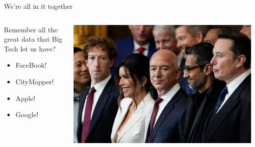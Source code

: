 \documentclass[
  ignorenonframetext,
  aspectratio=149,
]{beamer}
\providecommand{\tightlist}{%
  \setlength{\itemsep}{0pt}\setlength{\parskip}{0pt}}\usepackage{longtable,booktabs,array}
\begin{document}
\begin{frame}{We're all in it together}
\label{were-all-in-it-together}
\begin{columns}[T]
\begin{column}{0.6\textwidth}
Remember all the great data that Big Tech let us have?

\begin{itemize}
\tightlist
\item
  FaceBook!
\item
  CityMapper!
\item
  Apple!
\item
  Google!
\end{itemize}
\end{column}

\begin{column}{0.4\textwidth}
\includegraphics{images/tech_knobs.jpeg}
\end{column}
\end{columns}
\end{frame}
\end{document}
